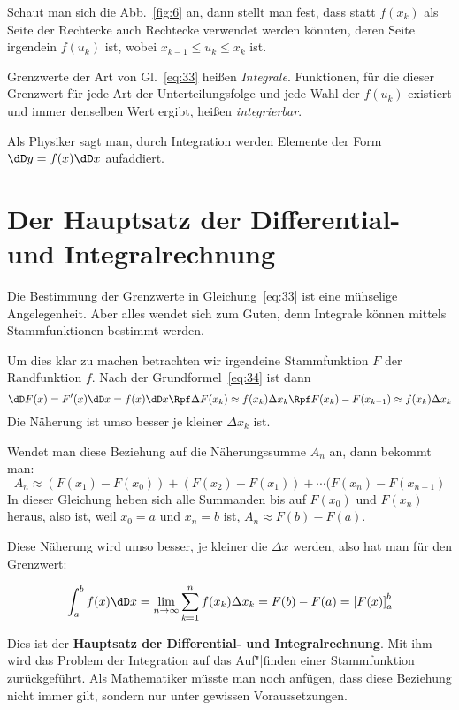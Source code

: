 Schaut man sich die Abb.~\ref{fig:6} an, dann stellt man fest, dass statt
$f(x_k)$ als Seite der Rechtecke auch Rechtecke verwendet werden könnten,
deren Seite irgendein $f(u_k)$ ist, wobei $x_{k-1}\le u_k\le x_k$ ist.

Grenzwerte der Art von Gl.~\eqref{eq:33} heißen \emph{Integrale}. Funktionen,
für die dieser Grenzwert für jede Art der Unterteilungsfolge und jede Wahl der
$f(u_k)$ existiert und immer denselben Wert ergibt, heißen \emph{integrierbar}.

Als Physiker sagt man, durch Integration werden Elemente der Form  $\dD
y=f(x)\dD x$
aufaddiert.

\section[Der Hauptsatz]{Der Hauptsatz der Differential- und
  Integralrechnung}
Die Bestimmung der Grenzwerte in Gleichung~\eqref{eq:33} ist eine mühselige
Angelegenheit. Aber alles wendet sich zum Guten, denn Integrale können mittels
Stammfunktionen bestimmt werden.

Um dies klar zu machen betrachten wir irgendeine Stammfunktion $F$ der
Randfunktion $f$. Nach der Grundformel~\eqref{eq:34} ist dann
\[
\dD F(x)=F'(x)\dD x=f(x)\dD x\Rpf
\Delta F(x_k)\approx f(x_k)\Delta x_k\Rpf
F(x_k)-F(x_{k-1})\approx f(x_k)\Delta x_k
\]
Die Näherung ist umso besser je kleiner $\Delta x_k$ ist.

Wendet man diese Beziehung auf die Näherungssumme $A_n$ an, dann bekommt man:
\[
A_n\approx(F(x_1)-F(x_0))+(F(x_2)-F(x_1))+\cdots (F(x_n)-F(x_{n-1})
\]
In dieser Gleichung heben sich alle Summanden bis auf $F(x_0)$ und $F(x_n)$
heraus, also ist, weil $x_0=a$ und $x_n=b$ ist, $A_n\approx F(b)-F(a)$.

Diese Näherung wird umso besser, je kleiner die $\Delta x$ werden, also hat
man für den Grenzwert:
\begin{merkbox}
\begin{equation}
  \label{eq:35}
  \int_a^b f(x)\dD x
  =\lim_{n\to\infty}\sum_{k=1}^n f(x_k)\Delta x_k = F(b) - F(a)
  =\left[F(x)\right]_a^b
\end{equation}
\end{merkbox}
Dies ist der \textbf{Hauptsatz der Differential- und Integralrechnung}. Mit
ihm wird das Problem der Integration auf das Auf"|finden einer Stammfunktion
zurückgeführt. Als Mathematiker müsste man noch anfügen, dass diese Beziehung
nicht immer gilt, sondern nur unter gewissen Voraussetzungen.

